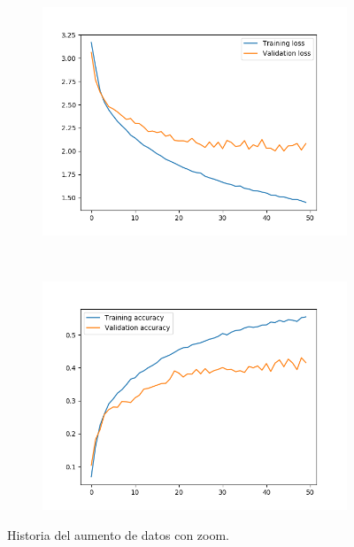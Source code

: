 \documentclass[11pt,a4paper]{article}
\begin{document}
\begin{figure}[H]
  \begin{subfigure}{.5\textwidth}
    \includegraphics[scale=0.4]{img/aug-zoom-loss.png}
    \label{fig:aug-zoom-loss}
  \end{subfigure}%
  ~ \quad
  \begin{subfigure}{.5\textwidth}
    \includegraphics[scale=0.4]{img/aug-zoom-acc.png}
    \label{fig:aug-zoom-acc}
  \end{subfigure}
  \caption{Historia del aumento de datos con zoom.}
  \label{fig:history-aug-zoom}
\end{figure}
\end{document}
